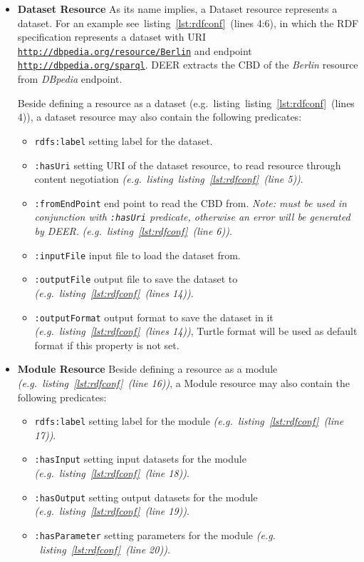 \documentclass[a4paper,twoside,bibtotoc,abstracton,12pt,BCOR=15mm]{article}
\newcommand{\geolift}{\textsc{DEER}\xspace}
\begin{document}
\begin{itemize}
 \item \textbf{Dataset Resource}
    As its name implies, a Dataset resource represents a dataset. 
    For an example see~listing~\ref{lst:rdfconf}~(lines 4:6), in which the RDF specification represents a dataset with URI \texttt{\url{http://dbpedia.org/resource/Berlin}} and endpoint \texttt{\url{http://dbpedia.org/sparql}}.
    \geolift extracts the CBD of the \emph{Berlin} resource from \emph{DBpedia} endpoint. 

    Beside defining a resource as a dataset (e.g.~listing~listing~\ref{lst:rdfconf}~(lines 4)),
    a dataset resource may also contain the following predicates:
    \begin{itemize}
	\item \texttt{rdfs:label} setting label for the dataset.
	\item \texttt{:hasUri} setting URI of the dataset resource, to read resource through content negotiation \emph{(e.g.~listing~listing~\ref{lst:rdfconf}~(line 5))}.
	\item \texttt{:fromEndPoint} end point to read the CBD from. 
	\emph{Note: must be used in conjunction with \texttt{:hasUri} predicate, otherwise an error will be generated by \geolift.} \emph{(e.g.~listing~\ref{lst:rdfconf}~(line 6))}.
	\item \texttt{:inputFile} input file to load the dataset from.
	\item \texttt{:outputFile} output file to save the dataset to \emph{(e.g.~listing~\ref{lst:rdfconf}~(lines 14))}.
	\item \texttt{:outputFormat} output format to save the dataset in it \emph{(e.g.~listing~\ref{lst:rdfconf}~(lines 14))}, Turtle format will be used as default format if this property is not set.
    \end{itemize}

  \item \textbf{Module Resource}
    Beside defining a resource as a module \emph{(e.g.~listing~\ref{lst:rdfconf}~(line 16))},
    a Module resource may also contain the following predicates:
    \begin{itemize}
	\item \texttt{rdfs:label} setting label for the module \emph{(e.g.~listing~\ref{lst:rdfconf}~(line 17))}.
	\item \texttt{:hasInput} setting input datasets for the module \emph{(e.g.~listing~\ref{lst:rdfconf}~(line 18))}.
	\item \texttt{:hasOutput} setting output datasets for the module \emph{(e.g.~listing~\ref{lst:rdfconf}~(line 19))}.
	\item \texttt{:hasParameter} setting parameters for the module \emph{(e.g. ~listing~\ref{lst:rdfconf}~(line 20))}.
    \end{itemize}


\end{itemize}
\end{document}
